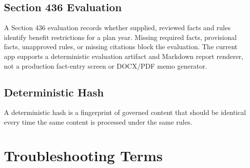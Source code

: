 \section{Section 436 Evaluation}

A Section 436 evaluation records whether supplied, reviewed facts and rules identify benefit restrictions for a plan year. Missing required facts, provisional facts, unapproved rules, or missing citations block the evaluation. The current app supports a deterministic evaluation artifact and Markdown report renderer, not a production fact-entry screen or DOCX/PDF memo generator.

\section{Deterministic Hash}

A deterministic hash is a fingerprint of governed content that should be identical every time the same content is processed under the same rules.

\chapter{Troubleshooting Terms}

